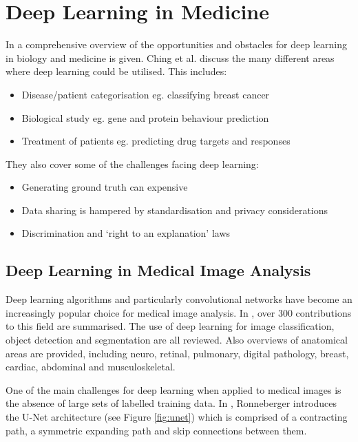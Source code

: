 \section{Deep Learning in Medicine}\label{deep_learning_medic_lit}

In \cite{Ching_Himmelstein_Beaulieu-Jones_Kalinin_Do_Way_Ferrero_Agapow_Zietz_Hoffman_et_al_2018} a comprehensive overview of the opportunities and obstacles for deep learning in biology and medicine is given.
Ching et al. discuss the many different areas where deep learning could be utilised.
This includes:

\begin{itemize}
    \item Disease/patient categorisation eg. classifying breast cancer
    \item Biological study eg. gene and protein behaviour prediction
    \item Treatment of patients eg. predicting drug targets and responses
\end{itemize}

They also cover some of the challenges facing deep learning:

\begin{itemize}
    \item Generating ground truth can expensive
    \item Data sharing is hampered by standardisation and privacy considerations
    \item Discrimination and `right to an explanation' laws
\end{itemize}

\subsection{Deep Learning in Medical Image Analysis}\label{deep_learning_medical_image}

Deep learning algorithms and particularly convolutional networks have become an increasingly popular choice for medical image analysis.
In \cite{Litjens_Kooi_Bejnordi_Setio_Ciompi_Ghafoorian_van_der_Laak_van_Ginneken_Sanchez_2017}, over 300 contributions to this field are summarised.
The use of deep learning for image classification, object detection and segmentation are all reviewed.
Also overviews of anatomical areas are provided, including neuro, retinal, pulmonary, digital pathology, breast, cardiac, abdominal and musculoskeletal.

One of the main challenges for deep learning when applied to medical images is the absence of large sets of labelled training data.
In \cite{Ronneberger_Fischer_Brox_2015}, Ronneberger introduces the U-Net architecture (see Figure \ref{fig:unet}) which is comprised of a contracting path, a symmetric expanding path and skip connections between them.

